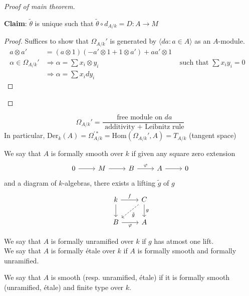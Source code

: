 \documentclass[oneside, 12pt, ]{scrbook}
\newcommand{\Hom}{\mathrm{Hom}}
\theoremstyle{theorem}
\begin{document}
\begin{proof}[Proof of main theorem]
\begin{enumerate}
\textbf{Claim}:  $\tilde{\theta}$ is unique such that $\tilde{\theta} \circ d_{A/k} = D : A \rightarrow M$
\begin{proof}
Suffices to show that $\Omega_{A/k}'$ is generated by $\langle da : a \in A \rangle$ as an $A$-module. 
\begin{align*}
a\otimes a' &= (a \otimes 1)(-a' \otimes 1 + 1 \otimes a') + aa' \otimes 1 & &\\
\alpha \in \Omega_{A/k}' &\Rightarrow \alpha = \sum x_{i} \otimes y_{i} &\text{ such that } \sum x_{i}y_{i} = 0 \\
&\Rightarrow \alpha = \sum x_{i}dy_{i}
\end{align*}
\end{proof}
\end{enumerate}
\end{proof}

\begin{corollary}
$$\Omega_{A/k}' = \frac{\text{ free module on } da}{\text{ additivity + Leibnitz rule}}$$
In particular, $\mathrm{Der}_{k}(A) = \Omega_{A/k}^{'*} = \Hom(\Omega_{A/k}',A) = T_{A/k}$ (tangent space)
\end{corollary}


\begin{definition}
We say that $A$ is formally smooth over $k$ if given any square zero extension \[\begin{tikzcd}
	0 & M & B & A & 0
	\arrow[from=1-1, to=1-2]
	\arrow[from=1-2, to=1-3]
	\arrow["\varphi", from=1-3, to=1-4]
	\arrow[from=1-4, to=1-5]
\end{tikzcd}\] and a diagram of $k$-algebras, there exists a lifting $\tilde{g}$ of $g$ 
\[\begin{tikzcd}
	k & C \\
	B & A
	\arrow[from=1-1, to=2-1]
	\arrow["f", from=1-1, to=1-2]
	\arrow["\varphi"', from=2-1, to=2-2]
	\arrow["g", from=1-2, to=2-2]
	\arrow["{\tilde{g}}", dashed, from=1-2, to=2-1]
\end{tikzcd}\]
\end{definition}

\begin{definition}
We say that $A$ is formally unramified over $k$ if $g$ has atmost one lift. \\
We say that $A$ is formally \'{e}tale over $k$ if $A$ is formally smooth and formally unramified.
\end{definition}

\begin{definition}
We say that $A$ is smooth (resp. unramified, \'{e}tale) if it is formally smooth (unramified, \'{e}tale) and finite type over $k$.
\end{definition}
\end{document}
